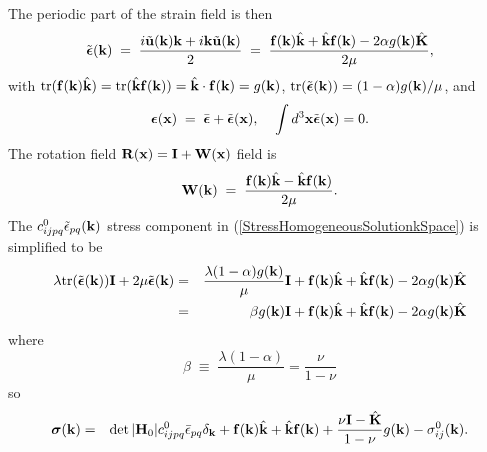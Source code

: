 \documentclass[12pt]{article}
\def\bmath#1{\mbox{\boldmath$#1$}}
\begin{document}
The periodic part of the strain field is then
\begin{equation}
 \tilde{\bmath{\epsilon}}({\bf k}) \;=\; \frac{i\tilde{\bf u}({\bf k}){\bf k}+i{\bf k}\tilde{\bf u}({\bf k})}{2} \;=\;
\frac{{\bf f}({\bf k})\hat{\bf k}+\hat{\bf k}{\bf f}({\bf k}) - 2\alpha g({\bf k})\hat{\bf K}}
 {2\mu},
\end{equation}
with ${\rm tr}({\bf f}({\bf k})\hat{\bf k})={\rm tr}(\hat{\bf k}{\bf
f}({\bf k}))=\hat{\bf k}\cdot {\bf f}({\bf k})=g({\bf k})$, ${\rm tr}(\tilde{\bmath{\epsilon}}({\bf k}))=(1-\alpha)g({\bf k})/\mu$, and
\begin{equation}
 \bmath{\epsilon}({\bf x}) \;=\; \bar{\bmath{\epsilon}} + 
 \tilde{\bmath{\epsilon}}({\bf x}), \;\;\;\;
 \int d^3{\bf x} \tilde{\bmath{\epsilon}}({\bf x}) = 0.
\end{equation}
The rotation field ${\bf R}({\bf x})={\bf I}+{\bf W}({\bf x})$ 
 field is
\begin{equation}
 {\bf W}({\bf k}) \;=\; 
\frac{{\bf f}({\bf k})\hat{\bf k}-\hat{\bf k}{\bf f}({\bf k})}
 {2\mu}.
\end{equation}
The $c_{ijpq}^0\tilde{\epsilon}_{pq}({\bf k})$
stress component in (\ref{StressHomogeneousSolutionkSpace}) is simplified to be
\begin{eqnarray}
 \lambda {\rm tr}(\tilde{\bmath{\epsilon}}({\bf k})){\bf I} + 2\mu \tilde{\bmath{\epsilon}}({\bf k})  =&&  
\frac{\lambda(1-\alpha)g({\bf k})}{\mu}{\bf I} + 
 {\bf f}({\bf k})\hat{\bf k}+\hat{\bf k}{\bf f}({\bf k}) - 2\alpha g({\bf k})\hat{\bf K} \nonumber\\
 =&& \beta g({\bf k}){\bf I} + {\bf f}({\bf k})\hat{\bf k}+\hat{\bf k}{\bf f}({\bf k}) - 2\alpha g({\bf k})\hat{\bf K}
\end{eqnarray}
where
\begin{equation}
 \beta \;\equiv\; \frac{\lambda(1-\alpha)}{\mu} = \frac{\nu}{1-\nu}
\end{equation}
so
\begin{eqnarray}
 \bmath{\sigma}({\bf k}) =&& \det|{\bf H}_0|c_{ijpq}^0\bar{\epsilon}_{pq}\delta_{\bf k} 
+ {\bf f}({\bf k})\hat{\bf k}+\hat{\bf k}{\bf f}({\bf k}) 
+ \frac{\nu{\bf I}-\hat{\bf K}}{1-\nu}g({\bf k})  - \sigma^0_{ij}({\bf k}).
\label{StressIsotropicHomogeneousSolutionkSpace}
\end{eqnarray}
\end{document}
